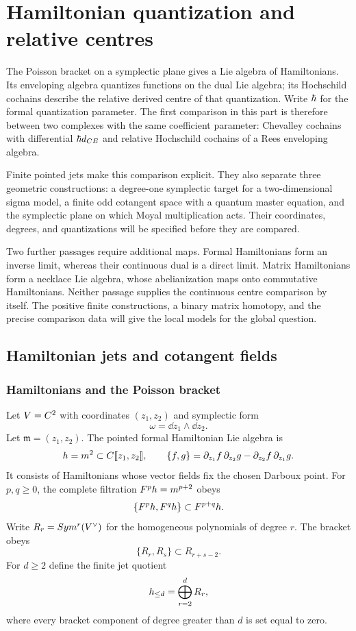 \part{Hamiltonian quantization and relative centres}
The Poisson bracket on a symplectic plane gives a Lie algebra of
Hamiltonians.  Its enveloping algebra quantizes functions on the dual
Lie algebra; its Hochschild cochains describe the relative derived
centre of that quantization.  Write $\hbar$ for the formal quantization
parameter.  The first comparison in this part is
therefore between two complexes with the same coefficient parameter:
Chevalley cochains with differential $\hbar d_{CE}$ and relative
Hochschild cochains of a Rees enveloping algebra.

Finite pointed jets make this comparison explicit.  They also separate
three geometric constructions: a degree-one symplectic target for a
two-dimensional sigma model, a finite odd cotangent space with a quantum
master equation, and the symplectic plane on which Moyal multiplication
acts.  Their coordinates, degrees, and quantizations will be specified
before they are compared.

Two further passages require additional maps.  Formal Hamiltonians form
an inverse limit, whereas their continuous dual is a direct limit.
Matrix Hamiltonians form a necklace Lie algebra, whose abelianization
maps onto commutative Hamiltonians.  Neither passage supplies the
continuous centre comparison by itself.  The positive finite
constructions, a binary matrix homotopy, and the precise comparison
data will give the local models for the global question.

\chapter{Hamiltonian jets and cotangent fields}
\section{Hamiltonians and the Poisson bracket}
Let $V=C^2$ with coordinates $(z_1,z_2)$ and symplectic form
\[
 \omega=\dd z_1\wedge\dd z_2.
\]
Let $\mathfrak m=(z_1,z_2)$.  The pointed formal Hamiltonian Lie algebra is
\[
 h=m^2\subset C\llbracket z_1,z_2\rrbracket,
 \qquad
 \{f,g\}=\partial_{z_1}f\,\partial_{z_2}g-
          \partial_{z_2}f\,\partial_{z_1}g.
\]
It consists of Hamiltonians whose vector fields fix the chosen Darboux
point.  For $p,q\ge0$, the complete filtration
$F^ph=m^{p+2}$ obeys
\[
 \{F^ph,F^qh\}\subset F^{p+q}h.
\]
Write $R_r=Sym^r(V^\vee)$ for the homogeneous polynomials of degree $r$.  The bracket obeys
\[
 \{R_r,R_s\}\subset R_{r+s-2}.
\]
For $d\ge2$ define the finite jet quotient
\[
 h_{\le d}=\bigoplus_{r=2}^{d}R_r,
\]
where every bracket component of degree greater than $d$ is set equal to zero.

